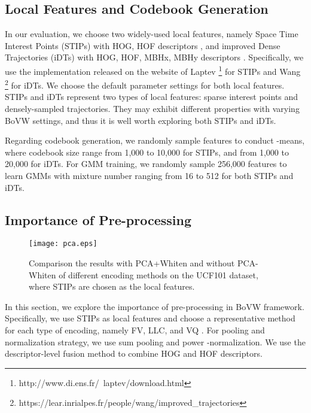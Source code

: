 \documentclass[twocolumn]{svjour3}          \smartqed  \usepackage{slashbox}
\begin{document}
\subsection{Local Features and Codebook Generation}
In our evaluation, we choose two widely-used local features, namely Space Time Interest Points (STIPs) \cite{Laptev05} with HOG, HOF descriptors \cite{LaptevMSR08}, and improved Dense Trajectories (iDTs) with HOG, HOF, MBHx, MBHy descriptors \cite{WangKSL13}. Specifically, we use the implementation released on the website of Laptev \footnote{http://www.di.ens.fr/~laptev/download.html} for STIPs and Wang \footnote{https://lear.inrialpes.fr/people/wang/improved\_trajectories} for iDTs. We choose the default parameter settings for both local features. STIPs and iDTs represent two types of local features: sparse interest points and densely-sampled trajectories. They may exhibit different properties with varying BoVW settings, and thus it is well worth exploring both STIPs and iDTs.

Regarding codebook generation, we randomly sample  features to conduct -means, where codebook size range from 1,000 to 10,000 for STIPs, and from 1,000 to 20,000 for iDTs. For GMM training, we randomly sample 256,000 features to learn GMMs with mixture number ranging from 16 to 512 for both STIPs and iDTs.

\subsection{Importance of Pre-processing}
\begin{figure}
  \centering
  \texttt{[image: pca.eps]}
  \caption{Comparison the results with PCA+Whiten and without PCA-Whiten of different encoding methods on the UCF101 dataset, where STIPs are chosen as the local features.}
  \label{fig:pca}
\end{figure}
In this section, we explore the importance of pre-processing in BoVW framework. Specifically, we use STIPs as local features and choose a representative method for each type of encoding, namely FV, LLC, and VQ . For pooling and normalization strategy, we use sum pooling and power -normalization. We use the descriptor-level fusion method to combine HOG and HOF descriptors.
\end{document}
